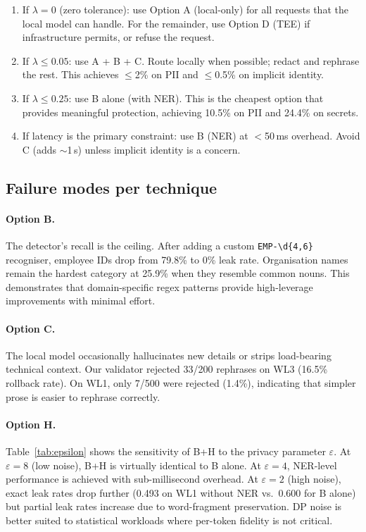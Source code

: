 \documentclass[11pt,a4paper]{article}
\begin{document}
\begin{enumerate}
  \item If $\lambda = 0$ (zero tolerance): use Option A
    (local-only) for all requests that the local model can handle.
    For the remainder, use Option D (TEE) if infrastructure
    permits, or refuse the request.
  \item If $\lambda \leq 0.05$: use A + B + C.  Route locally
    when possible; redact and rephrase the rest.  This achieves
    $\leq$2\% on PII and $\leq$0.5\% on implicit identity.
  \item If $\lambda \leq 0.25$: use B alone (with NER).  This is
    the cheapest option that provides meaningful protection,
    achieving 10.5\% on PII and 24.4\% on secrets.
  \item If latency is the primary constraint: use B (NER) at
    $<$50\,ms overhead.  Avoid C (adds $\sim$1\,s) unless
    implicit identity is a concern.
\end{enumerate}

\subsection{Failure modes per technique}

\paragraph{Option B.}
The detector's recall is the ceiling.  After adding a custom
\texttt{EMP-\textbackslash d\{4,6\}} recogniser, employee IDs
drop from 79.8\% to 0\% leak rate.  Organisation names remain
the hardest category at 25.9\% when they resemble common nouns.
This demonstrates that domain-specific regex patterns provide
high-leverage improvements with minimal effort.

\paragraph{Option C.}
The local model occasionally hallucinates new details or strips
load-bearing technical context.  Our validator rejected 33/200
rephrases on WL3 (16.5\% rollback rate).  On WL1, only 7/500
were rejected (1.4\%), indicating that simpler prose is easier
to rephrase correctly.

\paragraph{Option H.}
Table~\ref{tab:epsilon} shows the sensitivity of B+H to the
privacy parameter $\varepsilon$.  At $\varepsilon = 8$ (low noise),
B+H is virtually identical to B alone.  At $\varepsilon = 4$,
NER-level performance is achieved with sub-millisecond overhead.
At $\varepsilon = 2$ (high noise), exact leak rates drop further
(0.493 on WL1 without NER vs.\ 0.600 for B alone) but partial
leak rates increase due to word-fragment preservation.  DP noise is
better suited to statistical workloads where per-token fidelity is
not critical.
\end{document}

